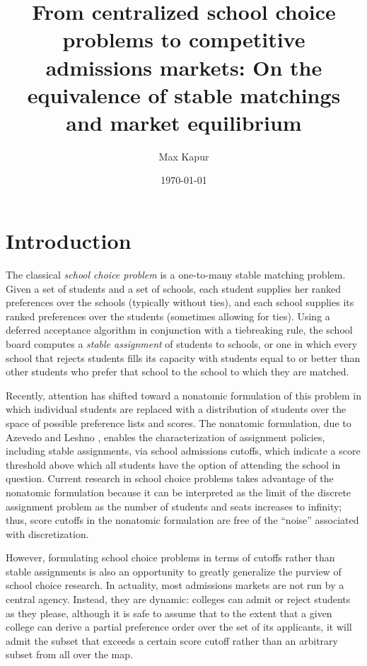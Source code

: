 \documentclass[12pt]{article}
\title{From centralized school choice problems to competitive admissions markets: On the equivalence of stable matchings and market equilibrium}
\date{\today}
\author{Max Kapur}
\theoremstyle{definition}
\begin{document}
\maketitle

\pagebreak
\tableofcontents

\pagebreak
\section{Introduction}
The classical \emph{school choice problem} is a one-to-many stable matching problem. Given a set of students and a set of schools, each student supplies her ranked preferences over the schools (typically without ties), and each school supplies its ranked preferences over the students (sometimes allowing for ties). Using a deferred acceptance algorithm in conjunction with a tiebreaking rule, the school board computes a \emph{stable assignment} of students to schools, or one in which every school that rejects students fills its capacity with students equal to or better than other students who prefer that school to the school to which they are matched.

Recently, attention has shifted toward a nonatomic formulation of this problem in which individual students are replaced with a distribution of students over the space of possible preference lists and scores. The nonatomic formulation, due to Azevedo and Leshno \parencite*{supplydemandfw}, enables the characterization of assignment policies, including stable assignments, via school admissions cutoffs, which indicate a score threshold above which all students have the option of attending the school in question. Current research in school choice problems takes advantage of the nonatomic formulation because it can be interpreted as the limit of the discrete assignment problem as the number of students and seats increases to infinity; thus, score cutoffs in the nonatomic formulation are free of the ``noise'' associated with discretization. 

However, formulating school choice problems in terms of cutoffs rather than stable assignments is also an opportunity to greatly generalize the purview of school choice research. In actuality, most admissions markets are not run by a central agency. Instead, they are dynamic: colleges can admit or reject students as they please, although it is safe to assume that to the extent that a given college can derive a partial preference order over the set of its applicants, it will admit the subset that exceeds a certain score cutoff rather than an arbitrary subset from all over the map. 
\end{document}
